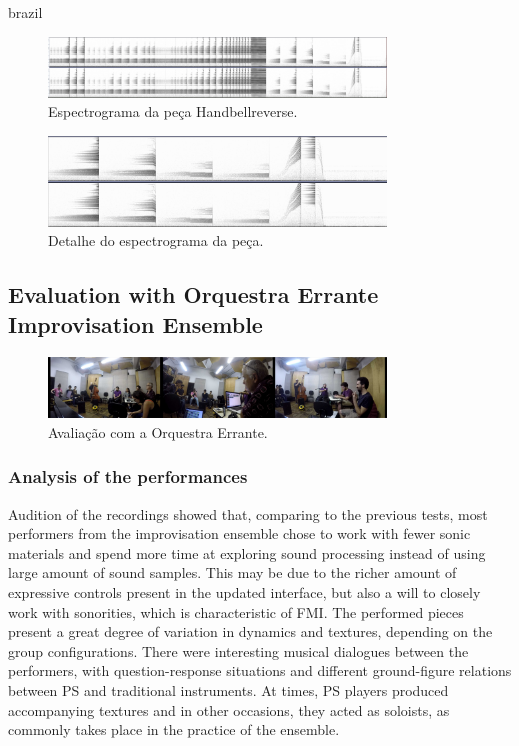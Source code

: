 \begin{otherlanguage*}{brazil}
\begin{figure}
\centering
\includegraphics[width=0.8\textwidth]{pictures/cap4/handbellreverse}
\caption{\label{handbell}Espectrograma da peça Handbellreverse.}
\label{fig:handbell}
\end{figure}

\begin{figure}
\centering
\includegraphics[width=0.8\textwidth]{pictures/cap4/handbellreverse_detail}
\caption{\label{handbelldt}Detalhe do espectrograma da peça.}
\label{fig:handbelldt}
\end{figure}

\subsection{Evaluation with Orquestra Errante Improvisation Ensemble}



\begin{figure}
\centering
\includegraphics[width=0.8\textwidth]{pictures/cap4/orquestra_errante_usertest}
\caption{\label{psorquestra}Avaliação com a Orquestra Errante.}
\label{fig:psorquestra}
\end{figure}

\subsubsection{Analysis of the performances}

Audition of the recordings showed that, comparing to the previous tests, most performers from the improvisation ensemble chose to work with fewer sonic materials and spend more time at exploring sound processing instead of using large amount of sound samples. This may be due to the richer amount of expressive controls present in the updated interface, but also a will to closely work with sonorities, which is characteristic of FMI. The performed pieces present a great degree of variation in dynamics and textures, depending on the group configurations. There were interesting musical dialogues between the performers, with question-response situations and different ground-figure relations between PS and traditional instruments. At times, PS players produced accompanying textures and in other occasions, they acted as soloists, as commonly takes place in the practice of the ensemble.



\end{otherlanguage*}
